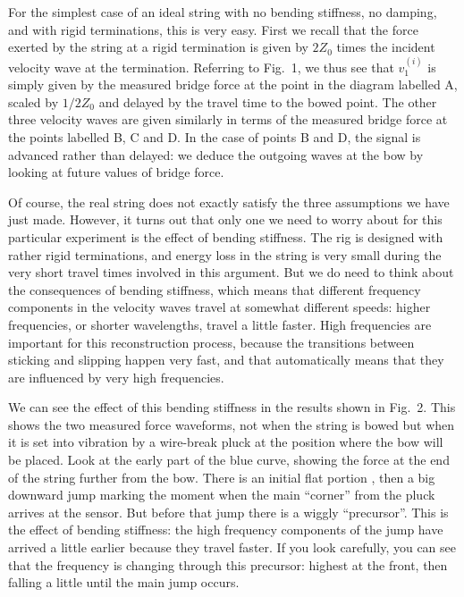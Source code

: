   For the simplest case of an ideal string with no bending stiffness, no 
  damping, and with rigid terminations, this is very easy. First we recall that 
  the force exerted by the string at a rigid termination is given by $2Z_0$ 
  times the incident velocity wave at the termination. Referring to Fig.\ 1, we 
  thus see that $v_1^{(i)}$ is simply given by the measured bridge force at the 
  point in the diagram labelled A, scaled by $1/2Z_0$ and delayed by the travel 
  time to the bowed point. The other three velocity waves are given similarly 
  in terms of the measured bridge force at the points labelled B, C and D. In 
  the case of points B and D, the signal is advanced rather than delayed: we 
  deduce the outgoing waves at the bow by looking at future values of bridge 
  force. 

  Of course, the real string does not exactly satisfy the three assumptions we 
  have just made. However, it turns out that only one we need to worry about 
  for this particular experiment is the effect of bending stiffness. The rig is 
  designed with rather rigid terminations, and energy loss in the string is 
  very small during the very short travel times involved in this argument. But 
  we do need to think about the consequences of bending stiffness, which means 
  that different frequency components in the velocity waves travel at somewhat 
  different speeds: higher frequencies, or shorter wavelengths, travel a little 
  faster. High frequencies are important for this reconstruction process, 
  because the transitions between sticking and slipping happen very fast, and 
  that automatically means that they are influenced by very high frequencies. 

  We can see the effect of this bending stiffness in the results shown in Fig.\ 
  2. This shows the two measured force waveforms, not when the string is bowed 
  but when it is set into vibration by a wire-break pluck at the position where 
  the bow will be placed. Look at the early part of the blue curve, showing the 
  force at the end of the string further from the bow. There is an initial flat 
  portion , then a big downward jump marking the moment when the main 
  ``corner'' from the pluck arrives at the sensor. But before that jump there 
  is a wiggly ``precursor''. This is the effect of bending stiffness: the high 
  frequency components of the jump have arrived a little earlier because they 
  travel faster. If you look carefully, you can see that the frequency is 
  changing through this precursor: highest at the front, then falling a little 
  until the main jump occurs. 

